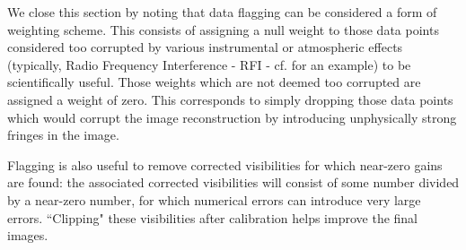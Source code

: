 \pg

\pg
We close this section by noting that data flagging can be considered a form of weighting scheme. This consists of assigning a null weight to those data points considered too corrupted by various instrumental or atmospheric effects (typically, Radio Frequency Interference - RFI - cf.  for an example) to be scientifically useful. Those weights which are not deemed too corrupted are assigned a weight of zero. This corresponds to simply dropping those data points which would corrupt the image reconstruction by introducing unphysically strong fringes in the image.

\pg
Flagging is also useful to remove corrected visibilities for which near-zero gains are found: the associated corrected visibilities will consist of some number divided by a near-zero number, for which numerical errors can introduce very large errors. ``Clipping" these visibilities after calibration helps improve the final images.